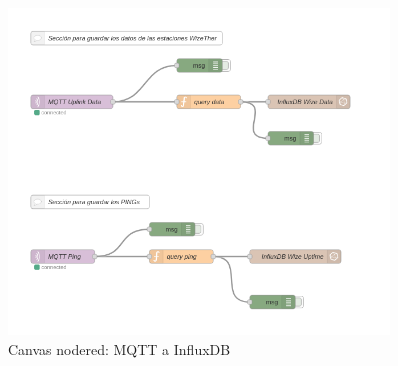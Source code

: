 \documentclass[12pt]{article}
\begin{document}
\begin{figure}[h]
	\begin{center}
		\includegraphics[width=0.9\textwidth]{img_rani/nodered_mqtt.png}
		\caption{Canvas nodered: MQTT a InfluxDB}
	\end{center}
\end{figure}
\end{document}
